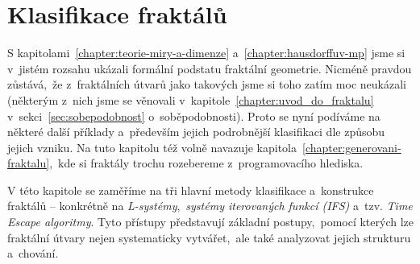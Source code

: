 \chapter{Klasifikace fraktálů}\label{chapter:klasifikace-fraktalu}

S kapitolami~\ref{chapter:teorie-miry-a-dimenze} a~\ref{chapter:hausdorffuv-mp} jsme si v~jistém rozsahu ukázali formální podstatu fraktální geometrie. Nicméně pravdou zůstává,~že z~fraktálních útvarů jako takových jsme si toho zatím moc neukázali (některým z~nich jsme se věnovali v~kapitole~\ref{chapter:uvod_do_fraktalu} v~sekci~\ref{sec:sobepodobnost} o~soběpodobnosti). Proto se nyní podíváme na některé další příklady a~především jejich podrobnější klasifikaci dle způsobu jejich vzniku. Na tuto kapitolu též volně navazuje kapitola~\ref{chapter:generovani-fraktalu},~kde si fraktály trochu rozebereme z~programovacího hlediska.

V této kapitole se zaměříme na tři hlavní metody klasifikace a~konstrukce fraktálů -- konkrétně na \emph{L-systémy},~\emph{systémy iterovaných funkcí (IFS)} a~tzv. \emph{Time Escape algoritmy}. Tyto přístupy představují základní postupy,~pomocí kterých lze fraktální útvary nejen systematicky vytvářet,~ale také analyzovat jejich strukturu a~chování.



